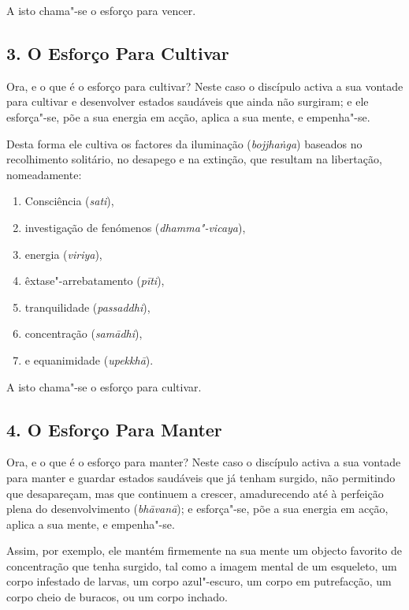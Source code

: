 A isto chama"-se o esforço para vencer.


\subsection{3. O Esforço Para Cultivar}


Ora, e o que é o esforço para cultivar? Neste caso o discípulo activa
a sua vontade para cultivar e desenvolver estados saudáveis que ainda não surgiram; e ele
esforça"-se, põe a sua energia em acção, aplica a sua mente, e empenha"-se.

Desta forma ele cultiva os factores da iluminação (\emph{bojjhaṅga}) baseados
no recolhimento solitário, no desapego e na extinção, que resultam na
libertação, nomeadamente:

\begin{enumerate}
  \item Consciência (\emph{sati}),
  \item investigação de fenómenos (\emph{dhamma"-vicaya}),
  \item energia (\emph{viriya}),
  \item êxtase"-arrebatamento (\emph{pīti}),
  \item tranquilidade (\emph{passaddhi}),
  \item concentração (\emph{samādhi}),
  \item e equanimidade (\emph{upekkhā}).
\end{enumerate}

A isto chama"-se o esforço para cultivar.

\subsection{4. O Esforço Para Manter}


Ora, e o que é o esforço para manter? Neste caso o discípulo activa a sua
vontade para manter e guardar estados saudáveis que já tenham surgido, não permitindo que
desapareçam, mas que continuem a crescer, amadurecendo até à perfeição plena do
desenvolvimento (\emph{bhāvanā}); e esforça"-se, põe a sua energia em acção,
aplica a sua mente, e empenha"-se.

Assim, por exemplo, ele mantém firmemente na sua mente um objecto favorito de
concentração que tenha surgido, tal como a imagem mental de um esqueleto, um
corpo infestado de larvas, um corpo azul"-escuro, um corpo em putrefacção, um
corpo cheio de buracos, ou um corpo inchado.

